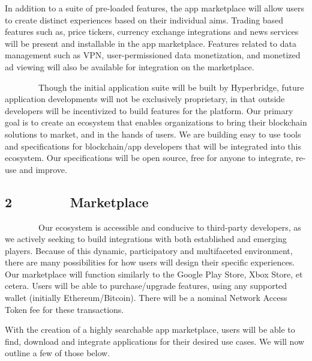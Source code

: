 \documentclass[]{article}
\begin{document}
{}

{In addition to a suite of pre-loaded features, the app marketplace will
allow users to create distinct experiences based on their individual
aims. Trading based features such as, price tickers, currency exchange
integrations and news services will be present and installable in the
app marketplace. Features related to data management such as VPN,
user-permissioned data monetization, and monetized ad viewing will also
be available for integration on the marketplace. }

{}

{~~~~~~~~Though the initial application suite will be built by
Hyperbridge, future application developments will not be exclusively
proprietary, in that outside developers will be incentivized to build
features for the platform. Our primary goal is to create an ecosystem
that enables organizations to bring their blockchain solutions to
market, and in the hands of users. We are building easy to use tools and
specifications for blockchain/app developers that will be integrated
into this ecosystem. Our specifications will be open source, free for
anyone to integrate, re-use and improve. }

{}

{}

\hypertarget{h.vwzlhmcm9xyr}{%
\subsection{\texorpdfstring{{2~~~~~~~~Marketplace}}{2~~~~~~~~Marketplace}}\label{h.vwzlhmcm9xyr}}

{}

{~~~~~~~~Our ecosystem is accessible and conducive to third-party
developers, as we actively seeking to build integrations with both
established and emerging players. Because of this dynamic, participatory
and multifaceted environment, there are many possibilities for how users
will design their specific experiences. Our marketplace will function
similarly to the Google Play Store, Xbox Store, et cetera. Users will be
able to purchase/upgrade features, using any supported wallet (initially
Ethereum/Bitcoin). There will be a nominal Network Access Token fee for
these transactions.}

{}

{With the creation of a highly searchable app marketplace, users will be
able to find, download and integrate applications for their desired use
cases. We will now outline a few of those below.}
\end{document}
